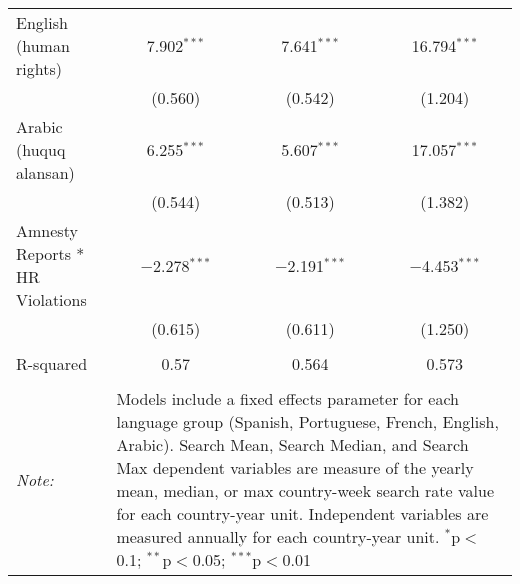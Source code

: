 \begin{table}[!htbp]
\begin{tabular}{@{\extracolsep{5pt}}lccc}
  English (human rights) & 7.902$^{***}$ & 7.641$^{***}$ & 16.794$^{***}$ \\ 
  & (0.560) & (0.542) & (1.204) \\ 
  Arabic (huquq alansan) & 6.255$^{***}$ & 5.607$^{***}$ & 17.057$^{***}$ \\ 
  & (0.544) & (0.513) & (1.382) \\ 
  Amnesty Reports * HR Violations & $-$2.278$^{***}$ & $-$2.191$^{***}$ & $-$4.453$^{***}$ \\ 
  & (0.615) & (0.611) & (1.250) \\ 
 \hline \\[-1.8ex] 
R-squared  & 0.57 & 0.564 & 0.573 \\ 
\hline 
\hline \\[-1.8ex] 
\textit{Note:}  & \multicolumn{3}{l}{\parbox[t]{8cm}{Models include a fixed effects parameter for each language group (Spanish, Portuguese, French, English, Arabic). Search Mean, Search Median, and Search Max dependent variables are measure of the yearly mean, median, or max country-week search rate value for each country-year unit. Independent variables are measured annually for each country-year unit. $^{*}$p$<$0.1; $^{**}$p$<$0.05; $^{***}$p$<$0.01}} \\ 
\end{tabular} 
\end{table} 
